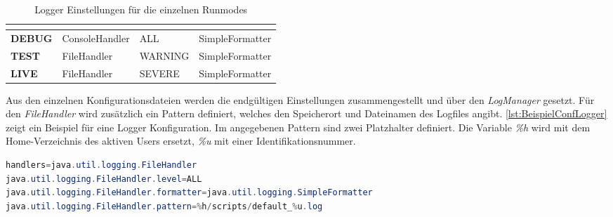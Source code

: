 \begin{table}[h]
	\centering
	\begin{tabular}{| l | l | l | l |}
		\hline
		\rowcolor[HTML]{3531FF} 
		\multicolumn{1}{|l|}{\cellcolor[HTML]{4F88BB}{\color[HTML]{FFFFFF} {\bf Runmode}}} & \multicolumn{1}{l|}{\cellcolor[HTML]{4F88BB}{\color[HTML]{FFFFFF} {\bf Handlers}}} & \multicolumn{1}{l|}{\cellcolor[HTML]{4F88BB}{\color[HTML]{FFFFFF} {\bf Loglevel}}} & \multicolumn{1}{l|}{\cellcolor[HTML]{4F88BB}{\color[HTML]{FFFFFF} {\bf Formatter}}} \\ \hline
		\textbf{DEBUG} & ConsoleHandler & ALL & SimpleFormatter \\  \hline
		\textbf{TEST} & FileHandler & WARNING & SimpleFormatter \\ \hline
		\textbf{LIVE} & FileHandler & SEVERE & SimpleFormatter \\  \hline
	\end{tabular}
	\caption{Logger Einstellungen für die einzelnen Runmodes\footnotemark}
	\label{tbl:LoggerSettingsRunmode}
\end{table}

Aus den einzelnen Konfigurationsdateien werden die endgültigen Einstellungen zusammengestellt und über den \textit{LogManager} gesetzt. Für den \textit{FileHandler} wird zusätzlich ein Pattern definiert, welches den Speicherort und Dateinamen des Logfiles angibt. \autoref{lst:BeispielConfLogger} zeigt ein Beispiel für eine Logger Konfiguration. Im angegebenen Pattern sind zwei Platzhalter definiert. Die Variable \textit{\%h} wird mit dem Home-Verzeichnis des aktiven Users ersetzt, \textit{\%u} mit einer Identifikationsnummer. \\

\begin{lstlisting}[language=Java,caption=Beispiel Konfiguration für den Logger,label=lst:BeispielConfLogger]
handlers=java.util.logging.FileHandler
java.util.logging.FileHandler.level=ALL
java.util.logging.FileHandler.formatter=java.util.logging.SimpleFormatter
java.util.logging.FileHandler.pattern=%h/scripts/default_%u.log
\end{lstlisting}


